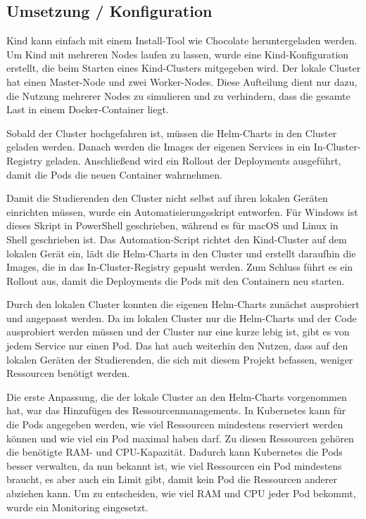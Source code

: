 \subsection{Umsetzung / Konfiguration}

Kind kann einfach mit einem Install-Tool wie Chocolate heruntergeladen werden.
Um Kind mit mehreren Nodes laufen zu lassen, wurde eine Kind-Konfiguration erstellt, die beim Starten eines Kind-Clusters mitgegeben wird.
Der lokale Cluster hat einen Master-Node und zwei Worker-Nodes. 
Diese Aufteilung dient nur dazu, die Nutzung mehrerer Nodes zu simulieren und zu verhindern, dass die gesamte Last in einem Docker-Container liegt. 

Sobald der Cluster hochgefahren ist, müssen die Helm-Charts in den Cluster geladen werden. 
Danach werden die Images der eigenen Services in ein In-Cluster-Registry geladen. Anschließend wird ein Rollout der Deployments ausgeführt, damit die Pods die neuen Container wahrnehmen.

Damit die Studierenden den Cluster nicht selbst auf ihren lokalen Geräten einrichten müssen, wurde ein Automatisierungsskript entworfen. Für Windows ist dieses Skript in PowerShell geschrieben, während es für macOS und Linux in Shell geschrieben ist.
Das Automation-Script richtet den Kind-Cluster auf dem lokalen Gerät ein, lädt die Helm-Charts in den Cluster und erstellt daraufhin die Images, die in das In-Cluster-Registry gepusht werden. Zum Schluss führt es ein Rollout aus, damit die Deployments die Pods mit den Containern neu starten. 

Durch den lokalen Cluster konnten die eigenen Helm-Charts zunächst ausprobiert und angepasst werden.
Da im lokalen Cluster nur die Helm-Charts und der Code ausprobiert werden müssen und der Cluster nur eine kurze lebig ist, gibt es von jedem Service nur einen Pod.
Das hat auch weiterhin den Nutzen, dass auf den lokalen Geräten der Studierenden, die sich mit diesem Projekt befassen, weniger Ressourcen benötigt werden.

Die erste Anpassung, die der lokale Cluster an den Helm-Charts vorgenommen hat, war das Hinzufügen des Ressourcenmanagements.
In Kubernetes kann für die Pods angegeben werden, wie viel Ressourcen mindestens reserviert werden können und wie viel ein Pod maximal haben darf. 
Zu diesen Ressourcen gehören die benötigte RAM- und CPU-Kapazität. Dadurch kann Kubernetes die Pods besser verwalten, da nun bekannt ist, wie viel Ressourcen ein Pod mindestens braucht, es aber auch ein Limit gibt, damit kein Pod die Ressourcen anderer abziehen kann.
Um zu entscheiden, wie viel RAM und CPU jeder Pod bekommt, wurde ein Monitoring eingesetzt.

